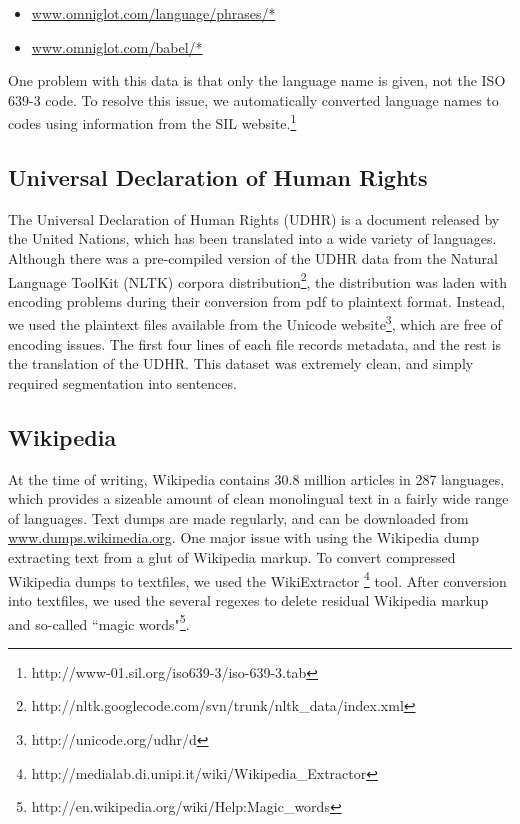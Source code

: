 \documentclass[11pt]{article}
\begin{document}
\begin{itemize}[noitemsep]
\item \url{www.omniglot.com/language/phrases/*} 
\item \url{www.omniglot.com/babel/*}
\end{itemize}

\noindent One problem with this data is that only the language name is given, not the ISO 639-3 code. To resolve this issue, we automatically converted language names to codes using information from the SIL website.\footnote{http://www-01.sil.org/iso639-3/iso-639-3.tab}

\subsection{Universal Declaration of Human Rights}

The Universal Declaration of Human Rights (UDHR) is a document released by the United Nations, which has been translated into a wide variety of languages. Although there was a pre-compiled version of the UDHR data from the Natural Language ToolKit (NLTK) corpora distribution\footnote{http://nltk.googlecode.com/svn/trunk/nltk\_data/index.xml}, the distribution was laden with encoding problems during their conversion from pdf to plaintext format. Instead, we used the plaintext files available from the Unicode website\footnote{http://unicode.org/udhr/d}, which are free of encoding issues. The first four lines of each file records metadata, and the rest is the translation of the UDHR. This dataset was extremely clean, and simply required segmentation into sentences.

\subsection{Wikipedia}

At the time of writing, Wikipedia contains 30.8 million articles in 287 languages, which provides a sizeable amount of clean monolingual text in a fairly wide range of languages. Text dumps are made regularly, and can be downloaded from \url{www.dumps.wikimedia.org}. One major issue with using the Wikipedia dump extracting text from a glut of Wikipedia markup. To convert compressed Wikipedia dumps to textfiles, we used the WikiExtractor \footnote{http://medialab.di.unipi.it/wiki/Wikipedia\_Extractor} tool. After conversion into textfiles, we used the several regexes to delete residual Wikipedia markup and so-called ``magic words"\footnote{http://en.wikipedia.org/wiki/Help:Magic\_words}.
\end{document}
